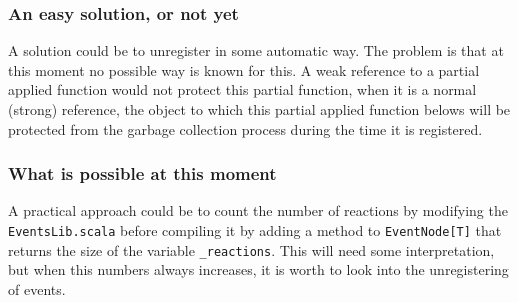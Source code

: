 \documentclass{article}
\begin{document}
\subsubsection{An easy solution, or not yet}
A solution could be to unregister in some automatic way. The problem
is that at this moment no possible way is known for this.  A weak
reference to a partial applied function would not protect this partial
function, when it is a normal (strong) reference, the object to which
this partial applied function belows will be protected from the
garbage collection process during the time it is registered.

\subsubsection{What is possible at this moment}
A practical approach could be to count the number of reactions by
modifying the {\tt EventsLib.scala} before compiling it by adding
a method to {\tt EventNode[T]} that returns the size of the variable
{\tt \_reactions}. This will need some interpretation, but when this
numbers always increases, it is worth to look into the unregistering
of events.
\end{document}
